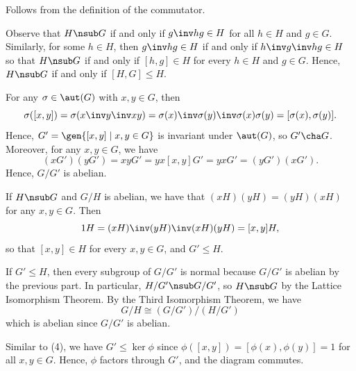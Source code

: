 \begin{proofnum}
    \item Follows from the definition of the commutator.
    \item Observe that $H \nsub G$ if and only if $g\inv hg \in H$ for all $h \in H$ and $g \in G$. Similarly, for some $h \in H$, then $g\inv hg \in H$ if and only if $h\inv g\inv hg \in H$ so that $H \nsub G$ if and only if $[h, g] \in H$ for every $h \in H$ and $g \in G$. Hence, $H \nsub G$ if and only if $[H, G] \leq H$.
    \item For any $\sigma \in \aut(G)$ with $x, y \in G$, then
    \[\sigma([x, y]) = \sigma(x\inv y\inv xy) = \sigma(x)\inv \sigma(y)\inv \sigma(x)\sigma(y) = [\sigma(x), \sigma(y)].\]
    Hence, $G' = \gen{[x, y] \mid x, y \in G}$ is invariant under $\aut(G)$, so $G' \cha G$. Moreover, for any $x, y \in G$, we have
    \[(xG') (yG') = xyG' = yx[x, y]G' = yxG' = (yG')(xG').\]
    Hence, $G/G'$ is abelian.
    \item If $H \nsub G$ and $G/H$ is abelian, we have that $(xH)(yH) = (yH)(xH)$ for any $x, y \in G$. Then
    \[1H = (xH)\inv (yH)\inv (xH)(yH) = [x, y]H,\]
    so that $[x, y] \in H$ for every $x, y \in G$, and $G' \leq H$.

    If $G' \leq H$, then every subgroup of $G/G'$ is normal because $G/G'$ is abelian by the previous part. In particular, $H/G' \nsub G/G'$, so $H \nsub G$ by the Lattice Isomorphism Theorem. By the Third Isomorphism Theorem, we have
    \[G/H \cong (G/G')/(H/G')\]
    which is abelian since $G/G'$ is abelian.
    \item Similar to (4), we have $G' \leq \ker\phi$ since $\phi([x, y]) = [\phi(x), \phi(y)] = 1$ for all $x, y \in G$. Hence, $\phi$ factors through $G'$, and the diagram commutes.
\end{proofnum}

